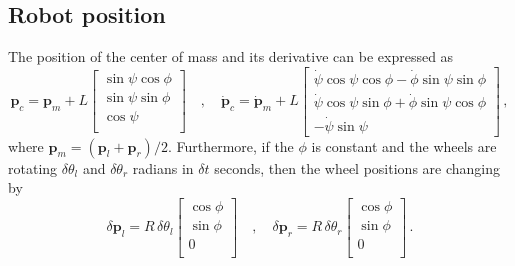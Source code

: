 \documentclass[a4paper]{article}
\renewcommand{\vec}[1]{\mathbf{#1}} %
\newcommand{\vp}{\vec{p}}
\newcommand{\pitch}{\psi}
\newcommand{\yaw}{\phi}
\newcommand{\roll}{\theta}
\begin{document}
\subsection{Robot position}

The position of the center of mass and its derivative can be expressed as
\begin{equation}
    \vp_c = \vp_m + L \left[ \begin{array}{c}
                                \sin\pitch \cos\yaw \\
                                \sin\pitch \sin\yaw \\
                                \cos\pitch \\
                             \end{array} \right]
    \quad , \quad
    \dot{\vp}_c = \dot{\vp}_m
    + L \left[ \begin{array}{c}
               \dot\pitch \cos\pitch \cos\yaw - \dot\yaw \sin\pitch \sin\yaw \\
               \dot\pitch \cos\pitch \sin\yaw + \dot\yaw \sin\pitch \cos\yaw \\
               - \dot\pitch \sin\pitch
               \end{array} \right]
    \,,
\end{equation}
where $\vp_m = (\vp_l + \vp_r) / 2$.
Furthermore, if the $\yaw$ is constant and the wheels are rotating
$\delta\roll_l$ and $\delta\roll_r$ radians in $\delta t$ seconds, then
the wheel positions are changing by
\begin{equation}
    \delta \vp_l = R \, \delta\roll_l \left[ \begin{array}{c}
                                                \cos\yaw \\
                                                \sin\yaw \\
                                                0 \\
                                             \end{array} \right]
    \quad , \quad
    \delta \vp_r = R \, \delta\roll_r \left[ \begin{array}{c}
                                                \cos\yaw \\
                                                \sin\yaw \\
                                                0 \\
                                             \end{array} \right]
    \,.
\end{equation}
\end{document}
